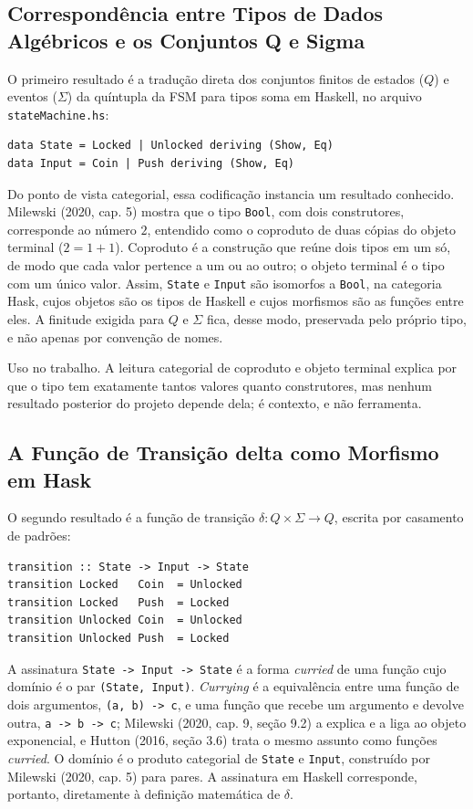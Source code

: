 \documentclass[12pt,a4paper]{article}
\begin{document}
\subsection{Correspondência entre Tipos de Dados Algébricos e os Conjuntos Q e Sigma}

O primeiro resultado é a tradução direta dos conjuntos finitos de estados ($Q$) e eventos ($\Sigma$) da quíntupla da FSM para tipos soma em Haskell, no arquivo \texttt{stateMachine.hs}:

\begin{verbatim}
data State = Locked | Unlocked deriving (Show, Eq)
data Input = Coin | Push deriving (Show, Eq)
\end{verbatim}

Do ponto de vista categorial, essa codificação instancia um resultado conhecido. Milewski (2020, cap. 5) mostra que o tipo \texttt{Bool}, com dois construtores, corresponde ao número $2$, entendido como o coproduto de duas cópias do objeto terminal ($2 = 1 + 1$). Coproduto é a construção que reúne dois tipos em um só, de modo que cada valor pertence a um ou ao outro; o objeto terminal é o tipo com um único valor. Assim, \texttt{State} e \texttt{Input} são isomorfos a \texttt{Bool}, na categoria Hask, cujos objetos são os tipos de Haskell e cujos morfismos são as funções entre eles. A finitude exigida para $Q$ e $\Sigma$ fica, desse modo, preservada pelo próprio tipo, e não apenas por convenção de nomes.

Uso no trabalho. A leitura categorial de coproduto e objeto terminal explica por que o tipo tem exatamente tantos valores quanto construtores, mas nenhum resultado posterior do projeto depende dela; é contexto, e não ferramenta.

\subsection{A Função de Transição delta como Morfismo em Hask}

O segundo resultado é a função de transição $\delta: Q \times \Sigma \to Q$, escrita por casamento de padrões:

\begin{verbatim}
transition :: State -> Input -> State
transition Locked   Coin  = Unlocked
transition Locked   Push  = Locked
transition Unlocked Coin  = Unlocked
transition Unlocked Push  = Locked
\end{verbatim}

A assinatura \texttt{State -> Input -> State} é a forma \textit{curried} de uma função cujo domínio é o par \texttt{(State, Input)}. \textit{Currying} é a equivalência entre uma função de dois argumentos, \texttt{(a, b) -> c}, e uma função que recebe um argumento e devolve outra, \texttt{a -> b -> c}; Milewski (2020, cap. 9, seção 9.2) a explica e a liga ao objeto exponencial, e Hutton (2016, seção 3.6) trata o mesmo assunto como funções \textit{curried}. O domínio é o produto categorial de \texttt{State} e \texttt{Input}, construído por Milewski (2020, cap. 5) para pares. A assinatura em Haskell corresponde, portanto, diretamente à definição matemática de $\delta$.
\end{document}
